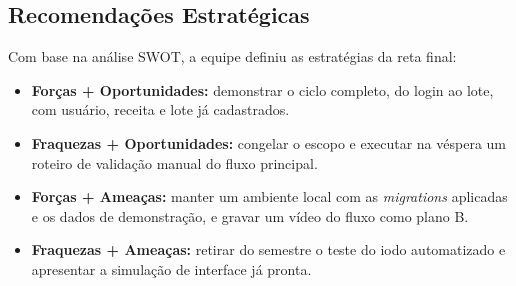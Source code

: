 \subsection{Recomendações Estratégicas}

Com base na análise SWOT, a equipe definiu as estratégias da reta final:

\begin{itemize}
\item \textbf{Forças + Oportunidades:} demonstrar o ciclo completo, do login ao lote, com usuário, receita e lote já cadastrados.
\item \textbf{Fraquezas + Oportunidades:} congelar o escopo e executar na véspera um roteiro de validação manual do fluxo principal.
\item \textbf{Forças + Ameaças:} manter um ambiente local com as \textit{migrations} aplicadas e os dados de demonstração, e gravar um vídeo do fluxo como plano B.
\item \textbf{Fraquezas + Ameaças:} retirar do semestre o teste do iodo automatizado e apresentar a simulação de interface já pronta.
\end{itemize}
